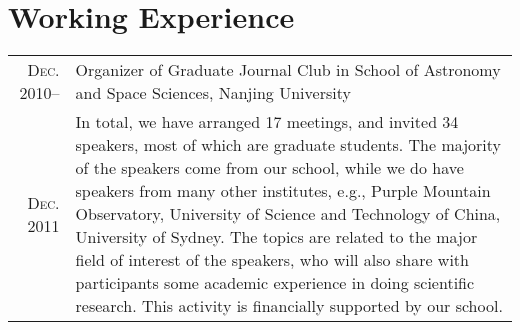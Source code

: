 \documentclass[10pt]{article}
\begin{document}
\section{Working Experience}
\begin{tabular}{rp{16cm}}
\textsc{Dec. 2010}--  & Organizer of Graduate Journal Club in School of Astronomy and Space Sciences, Nanjing University \\
\textsc{Dec. 2011}    & \small{In total, we have arranged 17 meetings, and invited 34 speakers, most of which are graduate students. The majority of the speakers come from our school, while we do have speakers from many other institutes, e.g., Purple Mountain Observatory, University of Science and Technology of China, University of Sydney. The topics are related to the major field of interest of the speakers, who will also share with participants some academic experience in doing scientific research. This activity is financially supported by our school.}  \\

\end{tabular}
\end{document}
